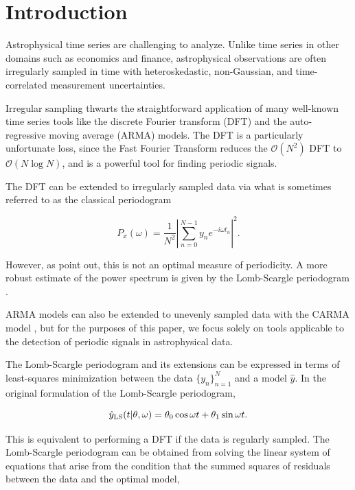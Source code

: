 \documentclass[apj]{emulateapj}
\newcommand{\bigO}{\mathcal{O}}
\begin{document}
\section{Introduction}\label{sec:introduction}

Astrophysical time series are challenging to analyze. Unlike
time series in other domains such as economics and finance, astrophysical 
observations are often irregularly sampled in time with heteroskedastic, 
non-Gaussian, and time-correlated measurement uncertainties.

Irregular sampling thwarts the straightforward application of many well-known 
time series tools like the discrete Fourier transform (DFT) and the auto-regressive 
moving average (ARMA) models. The DFT is a particularly unfortunate loss, since
the Fast Fourier Transform \citep{Cooley+Tukey_1965} reduces the $\bigO(N^2)$ DFT
to $\bigO(N\log N)$, and is a powerful tool for finding periodic signals.

The DFT can be extended to irregularly sampled data via what is sometimes
referred to as the classical periodogram \citep{Stoica+Li+He_2009}

\begin{equation}
    P_x(\omega) = \frac{1}{N^2}\left|\sum_{n=0}^{N - 1} y_n e^{- i \omega t_n}\right|^2.
\end{equation}

However, as \cite{Stoica+Li+He_2009} point out, this is not an
optimal measure of periodicity. A more robust estimate of the power spectrum is
given by the Lomb-Scargle periodogram \citep{Lomb_1976,Scargle_1982,Barning_1963,Vanicek_1971}.

ARMA models can also be extended to unevenly sampled data with the CARMA
model \citep{Kelly_etal_2014, Zinn_etal_2016}, but for the purposes of this paper, 
we focus solely on tools applicable to the detection of periodic signals in astrophysical data. 

The Lomb-Scargle periodogram and its extensions can be expressed in terms of 
least-squares minimization between the data $\{y_n\}_{n=1}^N$ and a model $\hat{y}$.
In the original formulation of the Lomb-Scargle periodogram, 

\begin{equation}
    \hat{y}_{\rm LS}(t|\theta, \omega) = \theta_0\cos{\omega t} + \theta_1\sin{\omega t}.
\end{equation}

This is equivalent to performing a DFT if the data is regularly sampled. The Lomb-Scargle
periodogram can be obtained from solving the linear system of equations that arise from
the condition that the summed squares of residuals between the data and the optimal
model,
\end{document}
